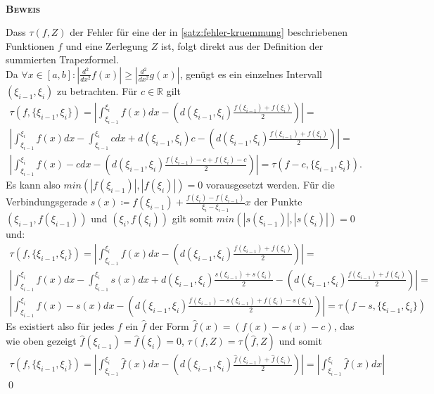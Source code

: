 \documentclass[12pt,a4paper]{scrartcl}
\numberwithin{equation}{section}
\numberwithin{myalgctr}{section}
\numberwithin{mytheoremctr}{subsection}
\numberwithin{mykorollarctr}{subsection}
\numberwithin{mylemmactr}{subsection}
\numberwithin{mybeispielctr}{subsection}
\newenvironment{myproof}{%
	\bigskip\noindent%
	\textsc{\textbf{\\Beweis\\}}%
	\indent
}{\qed\par\bigskip}  %
\begin{document}
	\begin{myproof}
		Dass $\tau(f,Z)$ der Fehler f\"ur eine der in \cref{satz:fehler-kruemmung} beschriebenen Funktionen $f$ und eine Zerlegung $Z$ ist, folgt direkt aus der Definition der summierten Trapezformel. \\
		Da $\forall x\in [a,b]: |\frac{d^2}{dx^2}f(x)|\geq |\frac{d^2}{dx^2}g(x)|$, gen\"ugt es ein einzelnes Intervall $(\xi_{i-1},\xi_i)$ zu betrachten. F\"ur $c\in\mathbb{R}$ gilt 
		\begin{gather*}
		\tau(f,\{\xi_{i-1},\xi_i\}) = \left|\int_{\xi_{i-1}}^{\xi_i}f(x)dx - \left(d(\xi_{i-1},\xi_i)\frac{f(\xi_{i-1})+f(\xi_i)}{2}\right)\right| =\\
		\left|\int_{\xi_{i-1}}^{\xi_i}f(x)dx - \int_{\xi_{i-1}}^{\xi_i}cdx + d(\xi_{i-1},\xi_i)c - \left(d(\xi_{i-1},\xi_i)\frac{f(\xi_{i-1})+f(\xi_i)}{2}\right)\right| = \\
		\left|\int_{\xi_{i-1}}^{\xi_i}f(x) - cdx  - \left(d(\xi_{i-1},\xi_i)\frac{f(\xi_{i-1})-c+f(\xi_i)-c}{2}\right)\right| = \tau(f-c,\{\xi_{i-1},\xi_i\}).
		\end{gather*}
		Es kann also $min(|f(\xi_{i-1})|,|f(\xi_{i})|) = 0$ vorausgesetzt werden. F\"ur die Verbindungsgerade $s(x)\coloneqq f(\xi_{i-1}) + \frac{f(\xi_{i}) - f(\xi_{i-1})}{\xi_{i} - \xi_{i-1}}x$ der Punkte $(\xi_{i-1},f(\xi_{i-1}))$ und $(\xi_{i},f(\xi_{i}))$ gilt somit $min(|s(\xi_{i-1})|, |s(\xi_{i})|) = 0$ und:
		\begin{gather*}
		\tau(f,\{\xi_{i-1},\xi_i\}) =\left|\int_{\xi_{i-1}}^{\xi_i}f(x)dx - \left(d(\xi_{i-1},\xi_i)\frac{f(\xi_{i-1})+f(\xi_i)}{2}\right)\right| =\\
		\left|\int_{\xi_{i-1}}^{\xi_i}f(x)dx - \int_{\xi_{i-1}}^{\xi_i}s(x)dx + d(\xi_{i-1},\xi_i)\frac{s(\xi_{i-1})+s(\xi_i)}{2} - \left(d(\xi_{i-1},\xi_i)\frac{f(\xi_{i-1})+f(\xi_i)}{2}\right)\right| = \\
		\left|\int_{\xi_{i-1}}^{\xi_i}f(x) - s(x)dx  - \left(d(\xi_{i-1},\xi_i)\frac{f(\xi_{i-1})-s(\xi_{i-1})+f(\xi_i)-s(\xi_i)}{2}\right)\right| = \tau(f-s,\{\xi_{i-1},\xi_i\})
		\end{gather*} 
		Es existiert also f\"ur jedes $f$  ein  $\hat{f}$ der Form $\hat{f}(x)=(f(x) - s(x) - c)$, das wie oben gezeigt $\hat{f}(\xi_{i-1}) = \hat{f}(\xi_{i}) = 0$, $\tau(f,Z) = \tau(\hat{f},Z)$ und somit
		\begin{align*}
			\tau(f,\{\xi_{i-1},\xi_i\}) = \left|\int_{\xi_{i-1}}^{\xi_i}\hat{f}(x)dx - \left(d(\xi_{i-1},\xi_i)\frac{\hat{f}(\xi_{i-1})+\hat{f}(\xi_i)}{2}\right)\right| = \left|\int_{\xi_{i-1}}^{\xi_i}\hat{f}(x)dx\right|

\end{align*}
\end{myproof}
\end{document}
